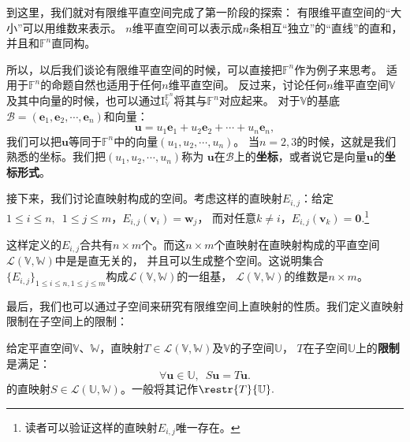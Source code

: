 \documentclass[12pt,UTF8,fontset=none]{ctexbook}
\begin{document}
到这里，我们就对有限维平直空间完成了第一阶段的探索：
有限维平直空间的“大小”可以用维数来表示。
$n$维平直空间可以表示成$n$条相互“独立”的“直线”的直和，并且和$\mathbb{F}^n$直同构。

所以，以后我们谈论有限维平直空间的时候，可以直接把$\mathbb{F}^n$作为例子来思考。
适用于$\mathbb{F}^n$的命题自然也适用于任何$n$维平直空间。
反过来，讨论任何$n$维平直空间$\mathbb{V}$及其中向量的时候，也可以通过$\mathrm{I}_{\mathbb{V}}^{\mathbb{F}^n}$将其与$\mathbb{F}^n$对应起来。
对于$\mathbb{V}$的基底$\mathcal{B} = (\mathbf{e}_1, \mathbf{e}_2, \cdots , \mathbf{e}_n)$和向量：
$$\mathbf{u} = u_1\mathbf{e}_1+u_2\mathbf{e}_2+\cdots+u_n\mathbf{e}_n,$$
我们可以把$\mathbf{u}$等同于$\mathbb{F}^n$中的向量$(u_1, u_2, \cdots , u_n)$。
当$n=2,3$的时候，这就是我们熟悉的坐标。我们把$(u_1, u_2, \cdots , u_n)$称为
$\mathbf{u}$在$\mathcal{B}$上的\textbf{坐标}，或者说它是向量$\mathbf{u}$的\textbf{坐标形式}。

接下来，我们讨论直映射构成的空间。考虑这样的直映射$E_{i,j}$：给定$1 \leq i \leq n, \,\, \, 1 \leq j \leq m$，$ E_{i,j} (\mathbf{v}_i)= \mathbf{w}_j$，
而对任意$k \neq i$，$E_{i,j}(\mathbf{v}_k) = \mathbf{0}.$\footnote{读者可以验证这样的直映射$E_{i,j}$唯一存在。}

这样定义的$E_{i,j}$合共有$n\times m$个。而这$n\times m$个直映射在直映射构成的平直空间$\mathcal{L}(\mathbb{V},\mathbb{W})$中是是直无关的，
并且可以生成整个空间。这说明集合$\{E_{i,j}\}_{1 \leq i \leq n,  1 \leq j \leq m}$构成$\mathcal{L}(\mathbb{V},\mathbb{W})$的一组基，
$\mathcal{L}(\mathbb{V},\mathbb{W})$的维数是$n\times m$。

最后，我们也可以通过子空间来研究有限维空间上直映射的性质。我们定义直映射限制在子空间上的限制：
\begin{df}\label{df:3_4}
    给定平直空间$\mathbb{V}$、$\mathbb{W}$，直映射$T \in \mathcal{L}(\mathbb{V},\mathbb{W})$及$\mathbb{V}$的子空间$\mathbb{U}$，
    $T$在子空间$\mathbb{U}$上的\textbf{限制}是满足：
    $$ \forall \mathbf{u} \in \mathbb{U}, \,\,\, S\mathbf{u} = T\mathbf{u}. $$
    的直映射$S \in \mathcal{L}(\mathbb{U},\mathbb{W})$。一般将其记作$\restr{T}{\mathbb{U}}.$
\end{df}
\end{document}
